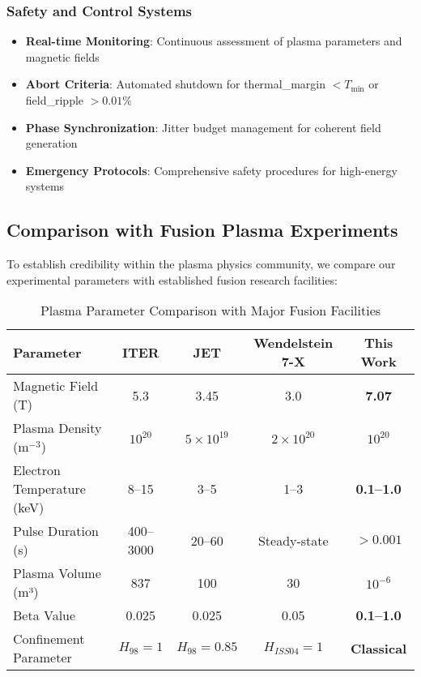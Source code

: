 \documentclass[12pt,a4paper]{article}
\begin{document}
\subsubsection{Safety and Control Systems}
\begin{itemize}
\item \textbf{Real-time Monitoring}: Continuous assessment of plasma parameters and magnetic fields
\item \textbf{Abort Criteria}: Automated shutdown for thermal\_margin $< T_{\min}$ or field\_ripple $> 0.01\%$
\item \textbf{Phase Synchronization}: Jitter budget management for coherent field generation
\item \textbf{Emergency Protocols}: Comprehensive safety procedures for high-energy systems
\end{itemize}

\subsection{Comparison with Fusion Plasma Experiments}

To establish credibility within the plasma physics community, we compare our experimental parameters with established fusion research facilities:

\begin{table}[htbp]
\centering
\caption{Plasma Parameter Comparison with Major Fusion Facilities}
\label{tab:fusion_comparison}
\begin{tabular}{@{}lcccc@{}}
\toprule
Parameter & ITER & JET & Wendelstein 7-X & \textbf{This Work} \\
\midrule
Magnetic Field (T) & 5.3 & 3.45 & 3.0 & \textbf{7.07} \\
Plasma Density (m$^{-3}$) & $10^{20}$ & $5 \times 10^{19}$ & $2 \times 10^{20}$ & \textbf{$10^{20}$} \\
Electron Temperature (keV) & 8--15 & 3--5 & 1--3 & \textbf{0.1--1.0} \\
Pulse Duration (s) & 400--3000 & 20--60 & Steady-state & \textbf{$>0.001$} \\
Plasma Volume (m³) & 837 & 100 & 30 & \textbf{$10^{-6}$} \\
Beta Value & 0.025 & 0.025 & 0.05 & \textbf{0.1--1.0} \\
Confinement Parameter & $H_{98} = 1$ & $H_{98} = 0.85$ & $H_{ISS04} = 1$ & \textbf{Classical} \\
\bottomrule
\end{tabular}
\end{table}
\end{document}
